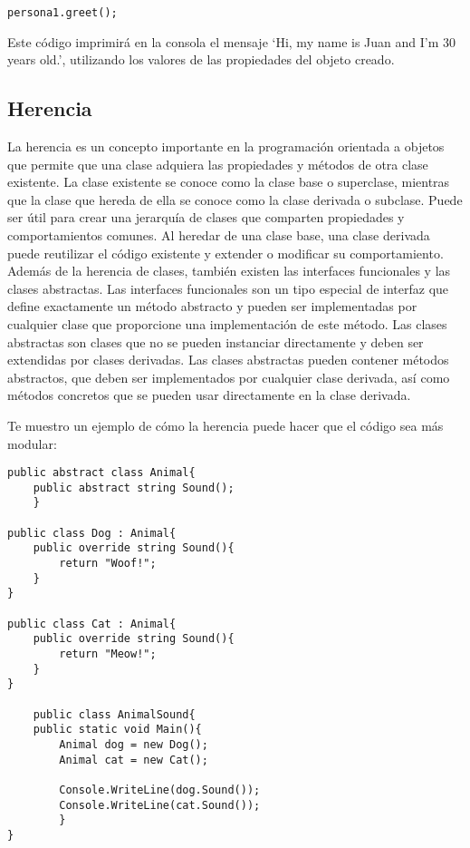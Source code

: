 \documentclass[executivepaper]{article}
\begin{document}
\begin{lstlisting}[language={[Sharp]C}]
persona1.greet();
\end{lstlisting}

Este código imprimirá en la consola el mensaje \enquote*{Hi, my name is  Juan and I'm 30 years old.}, utilizando los valores de las propiedades del objeto creado.

\subsection{Herencia}

La herencia es un concepto importante en la programación orientada a objetos que permite que una clase adquiera las propiedades y métodos de otra clase existente. La clase existente se conoce como la clase base o superclase, mientras que la clase que hereda de ella se conoce como la clase derivada o subclase. Puede ser útil para crear una jerarquía de clases que comparten propiedades y comportamientos comunes. Al heredar de una clase base, una clase derivada puede reutilizar el código existente y extender o modificar su comportamiento. Además de la herencia de clases, también existen las interfaces funcionales y las clases abstractas. Las interfaces funcionales son un tipo especial de interfaz que define exactamente un método abstracto y pueden ser implementadas por cualquier clase que proporcione una implementación de este método. Las clases abstractas son clases que no se pueden instanciar directamente y deben ser extendidas por clases derivadas. Las clases abstractas pueden contener métodos abstractos, que deben ser implementados por cualquier clase derivada, así como métodos concretos que se pueden usar directamente en la clase derivada.

Te muestro un ejemplo de cómo la herencia puede hacer que el código sea más modular:

\begin{lstlisting}
public abstract class Animal{
    public abstract string Sound();
    }

public class Dog : Animal{
    public override string Sound(){
        return "Woof!";
    }
}

public class Cat : Animal{
    public override string Sound(){
        return "Meow!";
    }
}

    public class AnimalSound{
    public static void Main(){
        Animal dog = new Dog();
        Animal cat = new Cat();

        Console.WriteLine(dog.Sound());
        Console.WriteLine(cat.Sound());
        }
}
\end{lstlisting}
\end{document}
